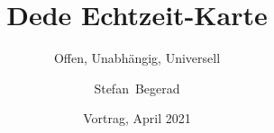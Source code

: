 


\usepackage{hyperref}

\usebackgroundtemplate

\usepackage{tikz}

\usepackage{listings}

\title[Dede]%
{Dede Echtzeit-Karte}

\subtitle{Offen, Unabhängig, Universell}

\author[Begerad]%
{Stefan~Begerad}

\date[April 2021]%
{Vortrag, April 2021}


